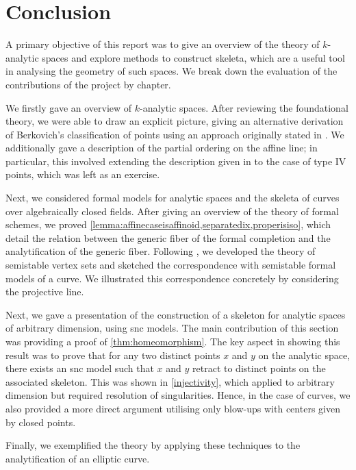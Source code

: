 \chapter{Conclusion}

A primary objective of this report was to give an overview of the theory of $k$-analytic spaces and explore methods to construct skeleta, which are a useful tool in analysing the geometry of such spaces.
We break down the evaluation of the contributions of the project by chapter.

We firstly gave an overview of $k$-analytic spaces.
After reviewing the foundational theory, we were able to draw an explicit picture, giving an alternative derivation of Berkovich's classification of points using an approach originally stated in \parencite[Exercise 2.3.3.5]{temk}.
We additionally gave a description of the partial ordering on the affine line; in particular, this involved extending the description given in \parencite{bakernotes} to the case of type IV points, which was left as an exercise.

Next, we considered formal models for analytic spaces and the skeleta of curves over algebraically closed fields.
After giving an overview of the theory of formal schemes, we proved \cref{lemma:affinecaseisaffinoid,separatedix,properisiso}, which detail the relation between the generic fiber of the formal completion and the analytification of the generic fiber.
Following \parencite{bpr}, we developed the theory of semistable vertex sets and sketched the correspondence with semistable formal models of a curve.
We illustrated this correspondence concretely by considering the projective line.

Next, we gave a presentation of the construction of a skeleton for analytic spaces of arbitrary dimension, using snc models.
The main contribution of this section was providing a proof of \cref{thm:homeomorphism}.
The key aspect in showing this result was to prove that for any two distinct points $x$ and $y$ on the analytic space, there exists an snc model such that $x$ and $y$ retract to distinct points on the associated skeleton.
This was shown in \cref{injectivity}, which applied to arbitrary dimension but required resolution of singularities.
Hence, in the case of curves, we also provided a more direct argument utilising only blow-ups with centers given by closed points.

Finally, we exemplified the theory by applying these techniques to the analytification of an elliptic curve.

